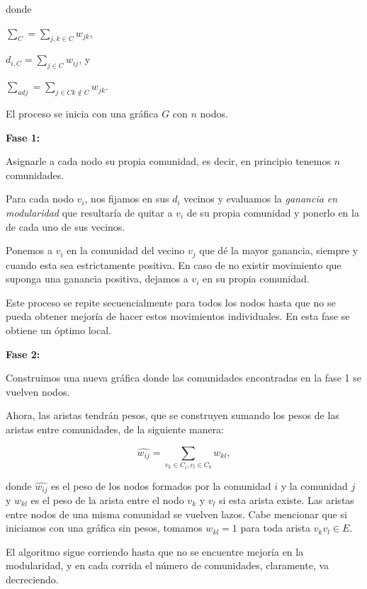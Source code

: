 \documentclass[conference]{IEEEtran}
\begin{document}
donde

$ \sum_{C} = \sum_{j,k \in C} w_{jk}$,

$ d_{i,C} = \sum_{j \in C} w_{ij}$, y

$  \sum_{adj} = \sum_{j\in C k \notin C} w_{jk}$.
 
\bigskip
El proceso se inicia con una gráfica $G$ con $n$ nodos.
\begin{compactenum}
\item[] \textbf{Fase 1:}
\item Asignarle a cada nodo su propia comunidad, es decir, en principio tenemos $n$ comunidades.
\item Para cada nodo $v_{i}$, nos fijamos en sus $d_{i}$ vecinos y evaluamos la \textit{ganancia en modularidad} que resultaría de quitar a $v_{i}$ de su propia comunidad y ponerlo en la de cada uno de sus vecinos. 
\item Ponemos a $v_{i}$ en la comunidad del vecino $v_{j}$ que dé la mayor ganancia, siempre y cuando esta sea estrictamente positiva. En caso de no existir movimiento que suponga una ganancia positiva, dejamos a $v_{i}$ en su propia comunidad.
\item Este proceso se repite secuencialmente para todos los nodos hasta que no se pueda obtener mejoría de hacer estos movimientos individuales. En esta fase se obtiene un óptimo local.
\end{compactenum}
\medskip 


\begin{compactenum}
\item[] \textbf{Fase 2:}
\item Construimos una nueva gráfica donde las comunidades encontradas en la fase 1 se vuelven nodos. 
\item Ahora, las aristas tendrán pesos, que se construyen sumando los pesos de las aristas entre comunidades, de la siguiente manera:

    $$\hat{w_{ij}} = \sum_{v_{k} \in C_{i}, v_{l} \in C_{k}} w_{kl} ,$$

donde $\hat{w_{ij}}$ es el peso de los nodos formados por la comunidad $i$ y la comunidad $j$ y $w_{kl}$ es el peso de la arista entre el nodo $v_k$ y $v_l$ si esta arista existe. Las aristas entre nodos de una misma comunidad se vuelven lazos. Cabe mencionar que si iniciamos con una gráfica sin pesos, tomamos $w_{kl}=1$ para toda arista $v_kv_l\in E$.
\end{compactenum}
\medskip

El algoritmo sigue corriendo hasta que no se encuentre mejoría en la modularidad, y en cada corrida el número de comunidades, claramente, va decreciendo. 
\end{document}

